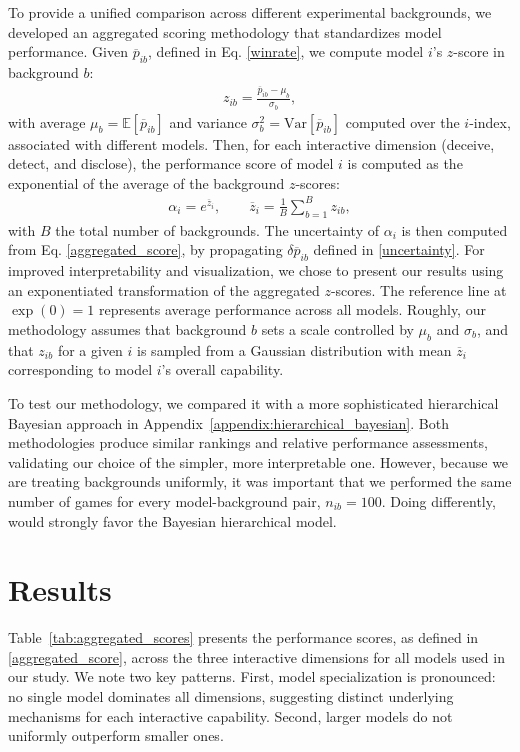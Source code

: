 \documentclass{article}
\begin{document}
To provide a unified comparison across different experimental backgrounds, we developed an aggregated scoring methodology that standardizes model performance. Given $\overline{p}_{ib}$, defined in Eq. \eqref{winrate}, we compute model $i$'s $z$-score in background $b$:
\begin{align}
    z_{ib}=\frac{\overline{p}_{ib}-\mu_b}{\sigma_b},
\end{align}
with average $\mu_b=\mathbb{E}[\overline{p}_{ib}]$ and variance $\sigma_b^2=\textrm{Var}[\overline{p}_{ib}]$ computed over the $i$-index, associated with different models. Then, for each interactive dimension (deceive, detect, and disclose), the performance score of model $i$ is computed as the exponential of the average of the background $z$-scores:
\begin{align}
    \alpha_i=e^{\overline{z}_i},\qquad \overline{z}_i=\frac{1}{B}\sum_{b=1}^Bz_{ib},
    \label{aggregated_score}
\end{align}
with $B$ the total number of backgrounds. The uncertainty of $\alpha_i$ is then computed from Eq. \eqref{aggregated_score}, by propagating $\delta\overline{p}_{ib}$ defined in \eqref{uncertainty}. For improved interpretability and visualization, we chose to present our results using an exponentiated transformation of the aggregated $z$-scores. The reference line at $\exp(0) = 1$ represents average performance across all models. Roughly, our methodology assumes that background $b$ sets a scale controlled by $\mu_b$ and $\sigma_b$, and that $z_{ib}$  for a given $i$ is sampled from a Gaussian distribution with mean $\overline{z}_i$ corresponding to model $i$'s overall capability. 

To test our methodology, we compared it with a more sophisticated hierarchical Bayesian approach in Appendix~\ref{appendix:hierarchical_bayesian}. Both methodologies produce similar rankings and relative performance assessments, validating our choice of the simpler, more interpretable one. However, because we are treating backgrounds uniformly, it was important that we performed the same number of games for every model-background pair, $n_{ib}=100$. Doing differently, would strongly favor the Bayesian hierarchical model.



\section{Results}
\label{sec:resuls}

Table~\ref{tab:aggregated_scores} presents the performance scores, as defined in \eqref{aggregated_score}, across the three interactive dimensions for all models used in our study. We note two key patterns. First, model specialization is pronounced: no single model dominates all dimensions, suggesting distinct underlying mechanisms for each interactive capability. Second, larger models do not uniformly outperform smaller ones.
\end{document}
